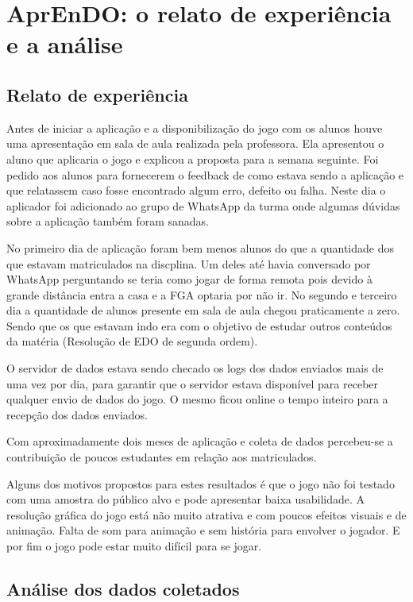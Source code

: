 \chapter[AprEnDO: o relato de experiência e a análise]{AprEnDO: o relato de experiência e a análise}
\section[Relato de experiência]{Relato de experiência}

Antes de iniciar a aplicação e a disponibilização do jogo com os alunos houve uma apresentação em sala de aula realizada pela professora. Ela apresentou o aluno que aplicaria o jogo e explicou a proposta para a semana seguinte. Foi pedido aos alunos para fornecerem o feedback de como estava sendo a aplicação e que relatassem caso fosse encontrado algum erro, defeito ou falha. Neste dia o aplicador foi adicionado ao grupo de WhatsApp da turma onde algumas dúvidas sobre a aplicação também foram sanadas.

No primeiro dia de aplicação foram bem menos alunos do que a quantidade dos que estavam matriculados na discplina. Um deles até havia conversado por WhatsApp perguntando se teria como jogar de forma remota pois devido à grande distância entra a casa e a FGA optaria por não ir. No segundo e terceiro dia a quantidade de alunos presente em sala de aula chegou praticamente a zero. Sendo que os que estavam indo era com o objetivo de estudar outros conteúdos da matéria (Resolução de EDO de segunda ordem).

O servidor de dados estava sendo checado os logs dos dados enviados mais de uma vez por dia, para garantir que o servidor estava disponível para receber qualquer envio de dados do jogo. O mesmo ficou online o tempo inteiro para a recepção dos dados enviados.

Com aproximadamente dois meses de aplicação e coleta de dados percebeu-se a contribuição de poucos estudantes em relação aos matriculados.

Alguns dos motivos propostos para estes resultados é que o jogo não foi testado com uma amostra do público alvo e pode apresentar baixa usabilidade. A resolução gráfica do jogo está não muito atrativa e com poucos efeitos visuais e de animação. Falta de som para animação e sem história para envolver o jogador. E por fim o jogo pode estar muito difícil para se jogar.

\section[Análise dos dados coletados]{Análise dos dados coletados}

